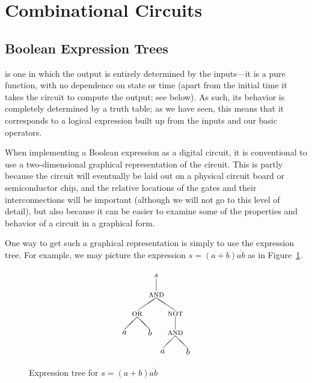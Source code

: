 
\section{Combinational Circuits}
\subsection{Boolean Expression Trees}
 is one in which the output is entirely determined by the inputs---it is a pure function, with no dependence on state or time (apart from the initial time it takes the circuit to compute the output; see below). As such, its behavior is completely determined by a truth table; as we have seen, this means that it corresponds to a logical expression built up from the inputs and our basic operators.

When implementing a Boolean expression as a digital circuit, it is conventional to use a two-dimensional graphical representation of the circuit. This is partly because the circuit will eventually be laid out on a physical circuit board or semiconductor chip, and the relative locations of the gates and their interconnections will be important (although we will not go to this level of detail), but also because it can be easier to examine some of the properties and behavior of a circuit in a graphical form.

One way to get such a graphical representation is simply to use the expression tree. For example, we may picture the expression $s=(a+b)\overline{ab}$ as in Figure~\ref{fig:exprtree}.
\begin{figure}
\[ \setlength{\unitlength}{0.75pt}
\begin{picture}(120,140)
\put(10,40){\makebox(0,0){$a$}}
\put(50,40){\makebox(0,0){$b$}}
\put(30,70){\makebox(0,0){\textsc{or}}}
\put(10,45){\line(1,1){20}}
\put(50,45){\line(-1,1){20}}
\put(70,10){\makebox(0,0){$a$}}
\put(110,10){\makebox(0,0){$b$}}
\put(90,40){\makebox(0,0){\textsc{and}}}
\put(70,15){\line(1,1){20}}
\put(110,15){\line(-1,1){20}}
\put(90,70){\makebox(0,0){\textsc{not}}}
\put(90,45){\line(0,1){20}}
\put(60,100){\makebox(0,0){\textsc{and}}}
\put(30,75){\line(3,2){30}}
\put(90,75){\line(-3,2){30}}
\put(60,130){\makebox(0,0){$s$}}
\put(60,105){\line(0,1){20}}
\end{picture} \]
\caption{Expression tree for $s=(a+b)\overline{ab}$}
\label{fig:exprtree}
\end{figure}


